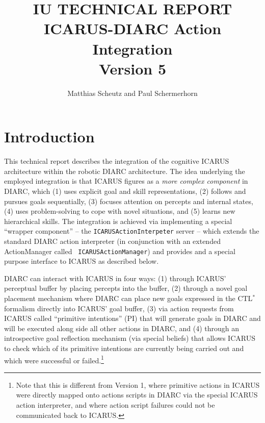 \documentclass{article}
\begin{document}
\title{IU TECHNICAL REPORT\\ICARUS-DIARC Action Integration\\Version 5}
\author{Matthias Scheutz and Paul Schermerhorn}

\maketitle

\section*{Introduction}

This technical report describes the integration of the cognitive
ICARUS architecture within the robotic DIARC architecture.  The idea
underlying the employed integration is that ICARUS figures as a {\em
  more complex component} in DIARC, which (1) uses explicit goal and
skill representations, (2) follows and pursues goals sequentially, (3)
focuses attention on percepts and internal states, (4) uses
problem-solving to cope with novel situations, and (5) learns new
hierarchical skills.  The integration is achieved via implementing a
special ``wrapper component'' -- the {\tt ICARUSActionInterpeter}
server -- which extends the standard DIARC action interpreter (in
conjunction with an extended ActionManager called {\tt
  ICARUSActionManager}) and provides and a special purpose interface
to ICARUS as described below.

DIARC can interact with ICARUS in four ways: (1) through ICARUS'
perceptual buffer by placing percepts into the buffer, (2) through a
novel goal placement mechanism where DIARC can place new goals
expressed in the CTL$^{*}$ formalism directly into ICARUS' goal
buffer, (3) via action requests from ICARUS called ``primitive
intentions'' (PI) that will generate goals in DIARC and will be
executed along side all other actions in DIARC, and (4) through an
introspective goal reflection mechanism (via special beliefs) that
allows ICARUS to check which of its primitive intentions are currently
being carried out and which were successful or failed.\footnote{Note
  that this is different from Version 1, where primitive actions in
  ICARUS were directly mapped onto actions scripts in DIARC via the
  special ICARUS action interpreter, and where action script failures
  could not be communicated back to ICARUS.}
\end{document}
